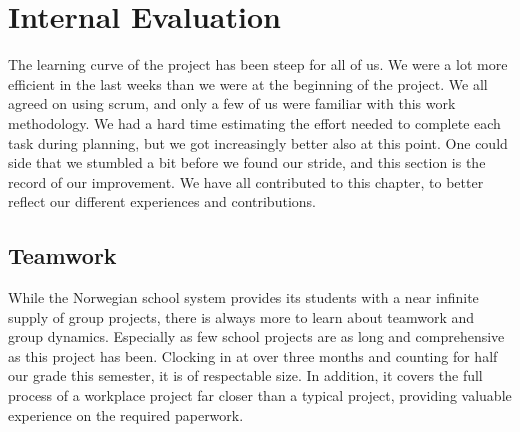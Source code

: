 \section{Internal Evaluation}\label{sec:refl_internal}
The learning curve of the project has been steep for all of us. We were a lot more efficient in the last weeks than we were at the beginning of the project. We all agreed on using scrum, and only a few of us were familiar with this work methodology. We had a hard time estimating the effort needed to complete each task during planning, but we got increasingly better also at this point. One could side that we stumbled a bit before we found our stride, and this section is the record of our improvement. We have all contributed to this chapter, to better reflect our different experiences and contributions.

\subsection{Teamwork}
While the Norwegian school system provides its students with a near infinite supply of group projects, there is always more to learn about teamwork and group dynamics. Especially as few school projects are as long and comprehensive as this project has been. Clocking in at over three months and counting for half our grade this semester, it is of respectable size. In addition, it covers the full process of a workplace project far closer than a typical project, providing valuable experience on the required paperwork.

\newpage

